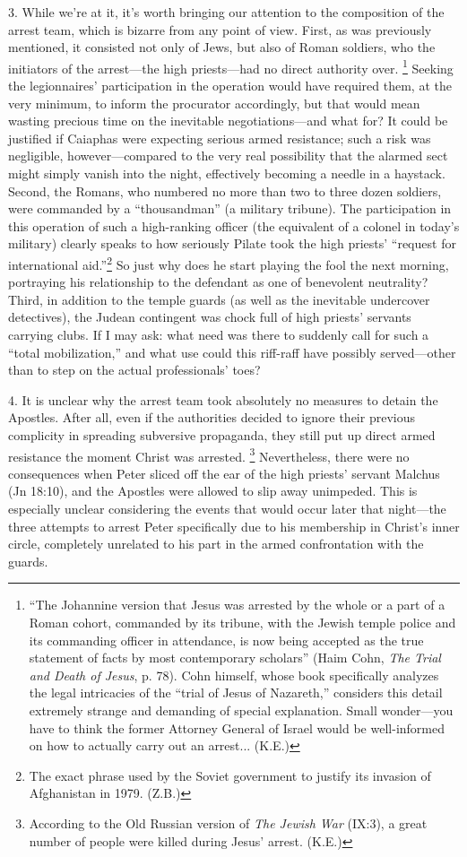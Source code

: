 3. While we're at it, it's worth bringing our attention to the composition of the arrest team, which is bizarre from any point of view. First, as was previously mentioned, it consisted not only of Jews, but also of Roman soldiers, who the initiators of the arrest---the high priests---had no direct authority over. \footnote{``The Johannine version that Jesus was arrested by the whole or a part of a Roman cohort, commanded by its tribune, with the Jewish temple police and its commanding officer in attendance, is now being accepted as the true statement of facts by most contemporary scholars'' (Haim Cohn, \emph{The Trial and Death of Jesus}, p. 78). Cohn himself, whose book specifically analyzes the legal intricacies of the ``trial of Jesus of Nazareth,'' considers this detail extremely strange and demanding of special explanation. Small wonder---you have to think the former Attorney General of Israel would be well-informed on how to actually carry out an arrest... (K.E.)} Seeking the legionnaires' participation in the operation would have required them, at the very minimum, to inform the procurator accordingly, but that would mean wasting precious time on the inevitable negotiations---and what for? It could be justified if Caiaphas were expecting serious armed resistance; such a risk was negligible, however---compared to the very real possibility that the alarmed sect might simply vanish into the night, effectively becoming a needle in a haystack. Second, the Romans, who numbered no more than two to three dozen soldiers, were commanded by a ``thousandman'' (a military tribune). The participation in this operation of such a high-ranking officer (the equivalent of a colonel in today's military) clearly speaks to how seriously Pilate took the high priests' ``request for international aid.''\footnote{The exact phrase used by the Soviet government to justify its invasion of Afghanistan in 1979. (Z.B.)} So just why does he start playing the fool the next morning, portraying his relationship to the defendant as one of benevolent neutrality? Third, in addition to the temple guards (as well as the inevitable undercover detectives), the Judean contingent was chock full of high priests' servants carrying clubs. If I may ask: what need was there to suddenly call for such a ``total mobilization,'' and what use could this riff-raff have possibly served---other than to step on the actual professionals' toes?

4. It is unclear why the arrest team took absolutely no measures to detain the Apostles. After all, even if the authorities decided to ignore their previous complicity in spreading subversive propaganda, they still put up direct armed resistance the moment Christ was arrested. \footnote{According to the Old Russian version of \emph{The Jewish War} (IX:3), a great number of people were killed during Jesus' arrest. (K.E.)} Nevertheless, there were no consequences when Peter sliced off the ear of the high priests' servant Malchus (Jn 18:10), and the Apostles were allowed to slip away unimpeded. This is especially unclear considering the events that would occur later that night---the three attempts to arrest Peter specifically due to his membership in Christ's inner circle, completely unrelated to his part in the armed confrontation with the guards.

